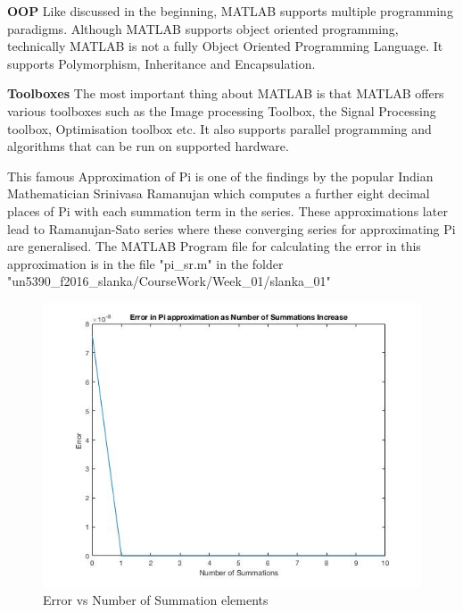 \documentclass[fleqn,letterpaper,12pt]{report}
\begin{document}
\textbf{OOP}\newline
Like discussed in the beginning, MATLAB supports multiple programming paradigms. Although MATLAB supports object oriented programming, technically MATLAB is not a fully Object Oriented Programming Language.
It supports Polymorphism, Inheritance and Encapsulation.

\textbf{Toolboxes}\newline
The most important thing about MATLAB is that MATLAB offers various toolboxes such as the Image processing Toolbox, the Signal Processing toolbox, Optimisation toolbox etc. It also supports parallel programming and algorithms that can be run on supported hardware.

\vfill

%
\newpage
{}
{}
\problem
This famous Approximation of Pi is one of the findings by the popular Indian Mathematician Srinivasa Ramanujan which computes a further eight decimal places of Pi with each summation term in the series. These approximations later lead to Ramanujan-Sato series where these converging series for approximating Pi are generalised.\newline
The MATLAB Program file for calculating the error in this approximation is in the file "pi\_sr.m" in the folder "un5390\_f2016\_slanka/CourseWork/Week\_01/slanka\_01"\cite{Pi} 
\begin{figure}[ht!]
\centering
\includegraphics[width=140mm]{Pi_sr.jpg}
\caption{Error vs Number of Summation elements\label{overflow}}
\end{figure}
\end{document}
